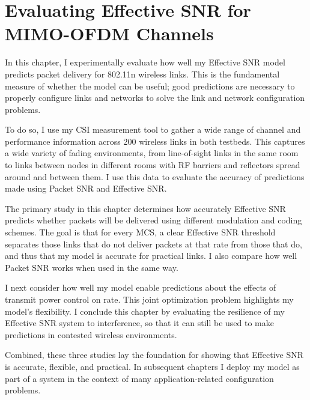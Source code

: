 \ifx\mainfile\undefined

\setcounter{chapter}{5} %
\fi

\cleardoublepage
\chapter{Evaluating Effective SNR for MIMO-OFDM Channels}
\label{chap:delivery}

In this chapter, I experimentally evaluate how well my Effective SNR model predicts packet delivery for 802.11n wireless links. This is the fundamental measure of whether the model can be useful; good predictions are necessary to properly configure links and networks to solve the link and network configuration problems.

To do so, I use my CSI measurement tool to gather a wide range of channel and performance information across 200 wireless links in both testbeds. This captures a wide variety of fading environments, from line-of-sight links in the same room to links between nodes in different rooms with RF barriers and reflectors spread around and between them. I use this data to evaluate the accuracy of predictions made using Packet SNR and Effective SNR.

The primary study in this chapter determines how accurately Effective SNR predicts whether packets will be delivered using different modulation and coding schemes. The goal is that for every MCS, a clear Effective SNR threshold separates those links that do not deliver packets at that rate from those that do, and thus that my model is accurate for practical links. I also compare how well Packet SNR works when used in the same way.

I next consider how well my model enable predictions about the effects of transmit power control on rate. This joint optimization problem highlights my model's flexibility. I conclude this chapter by evaluating the resilience of my Effective SNR system to interference, so that it can still be used to make predictions in contested wireless environments.

Combined, these three studies lay the foundation for showing that Effective SNR is accurate, flexible, and practical. In subsequent chapters I deploy my model as part of a system in the context of many application-related configuration problems.

